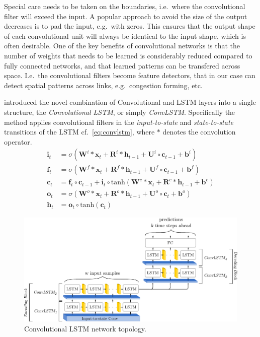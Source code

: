 \documentclass[preprint,11pt,5p,twocolumn]{elsarticle}
\newcommand{\matr}[1]{\mathbf{#1}}
\begin{document}
Special care needs to be taken on the boundaries, i.e.\ where the convolutional filter will exceed the input. A popular approach to avoid the size of the output decreases is to pad the input, e.g.\ with zeros. This ensures that the output shape of each convolutional unit will always be identical to the input shape, which is often desirable. One of the key benefits of convolutional networks is that the number of weights that needs to be learned is considerably reduced compared to fully connected networks, and that learned patterns can be transfered across space. I.e.\ the convolutional filters become feature detectors, that in our case can detect spatial patterns across links, e.g.\ congestion forming, etc.   

\citet{ConvLSTM} introduced the novel combination of Convolutional and LSTM layers into a single structure, the \emph{Convolutional LSTM}, or simply \emph{ConvLSTM}. Specifically the method applies convolutional filters in the \emph{input-to-state} and \emph{state-to-state} transitions of the LSTM cf.~\cref{eq:convlstm}, where $*$ denotes the convolution operator.
\begin{equation}
\begin{aligned}
  \matr{i}_t &= \sigma \left( \matr{W}^i * \matr{x}_t + \matr{R}^i * \matr{h}_{t-1} + \matr{U}^i \circ \matr{c}_{t-1} + \matr{b}^i \right) \\
  \matr{f}_t &= \sigma \left( \matr{W}^f * \matr{x}_t + \matr{R}^f * \matr{h}_{t-1} + \matr{U}^f \circ \matr{c}_{t-1} + \matr{b}^f \right) \\
  \matr{c}_t &= \matr{f}_t \circ \matr{c}_{t-1} + \matr{i}_t \circ \mathrm{tanh} \left( \matr{W}^c * \matr{x}_t + \matr{R}^c * \matr{h}_{t-1} + \matr{b}^c \right) \\
  \matr{o}_t &= \sigma \left( \matr{W}^\mathit{o} * \matr{x}_t + \matr{R}^\mathit{o} * \matr{h}_{t-1} + \matr{U}^\mathit{o} \circ \matr{c}_{t} + \matr{b}^o \right) \\
  \matr{h}_t &= \matr{o}_t \circ \mathrm{tanh} \left( \matr{c}_t \right)
\end{aligned}
\label{eq:convlstm}
\end{equation}
\vspace{.5em}

\begin{figure}[!t]
  \centering
  \includegraphics[scale=.75]{drawings/conv_lstm.pdf}
  \caption{Convolutional LSTM network topology.}
  \label{fig:ConvLSTM}
\end{figure}
\end{document}
